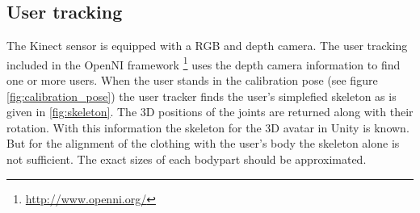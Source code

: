 \documentclass[a4paper]{article}
\begin{document}
\subsection{User tracking}
\label{sec:user_tracking}

The Kinect sensor is equipped with a RGB and depth camera. The user tracking included in the OpenNI framework \footnote{\url{http://www.openni.org/}} uses the depth camera information to find one or more users. When the user stands in the calibration pose (see figure \ref{fig:calibration_pose}) the user tracker finds the user's simplefied skeleton as is given in \ref{fig:skeleton}. The 3D positions of the joints are returned along with their rotation. With this information the skeleton for the 3D avatar in Unity is known. But for the alignment of the clothing with the user's body the skeleton alone is not sufficient. The exact sizes of each bodypart should be approximated.
\end{document}
